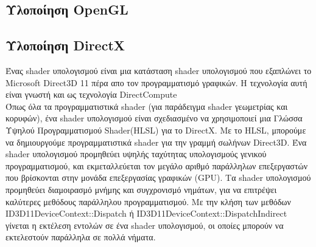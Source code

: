 \subsection{Υλοποίηση OpenGL}

\subsection{Υλοποίηση DirectX}
Ένας shader υπολογισμού είναι μια κατάσταση shader υπολογισμού που εξαπλώνει το Microsoft Direct3D 11 πέρα απο τον προγραμματισμό γραφικών. Η τεχνολογία αυτή είναι γνωστή και ως τεχνολογία DirectCompute\cite{computeshaders-4}
\\Όπως όλα τα προγραμματιστικά shader (για παράδειγμα shader γεωμετρίας και κορυφών), ένα shader υπολογισμού είναι σχεδιασμένο να χρησιμοποιεί μια Γλώσσα Υψηλού Προγραμματισμού Shader(HLSL) για το DirectX. Με το HLSL, μπορούμε να δημιουργούμε προγραμματιστικά shader για την γραμμή σωλήνων Direct3D. Ένα shader υπολογισμού προμηθεύει υψηλής ταχύτητας υπολογισμούς γενικού προγραμματισμού, και εκμεταλλεύεται τον μεγάλο αριθμό παράλληλων επεξεργαστών που βρίσκονται στην μονάδα επεξεργασίας γραφικών (GPU). Τα shader υπολογισμού προμηθεύει διαμοιρασμό μνήμης και συγχρονισμό νημάτων, για να επιτρέψει καλύτερες μεθόδους παράλληλου προγραμματισμού. Με την κλήση των μεθόδων ID3D11DeviceContext::Dispatch ή ID3D11DeviceContext::DispatchIndirect γίνεται η εκτέλεση εντολών σε ένα shader υπολογισμού, οι οποίες μπορούν να εκτελεστούν παράλληλα σε πολλά νήματα.